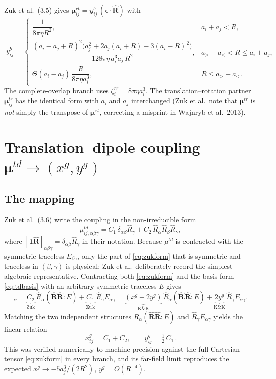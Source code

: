 \documentclass[11pt]{article}
\newcommand{\Rh}{\hat{\mathbf{R}}}
\newcommand{\Rhh}[1]{\hat{R}_{#1}}
\newcommand{\one}{\mathbf{1}}
\newcommand{\eps}{\bm{\epsilon}}
\begin{document}
Zuk et al.\ (3.5) gives $\bm{\mu}^{rt}_{ij}=y^b_{ij}\,(\eps\cdot\Rh)$ with
\begin{equation}
\boxed{\;
y^b_{ij}=
\begin{cases}
\dfrac{1}{8\pi\eta R^2}, & a_i+a_j<R,\\[12pt]
\dfrac{(a_i-a_j+R)^2\big(a_j^2+2a_j(a_i+R)-3(a_i-R)^2\big)}{128\pi\eta\, a_i^3 a_j\,R^2},
& a_>-a_<<R\le a_i+a_j,\\[12pt]
\Theta(a_i-a_j)\,\dfrac{R}{8\pi\eta a_i^3}, & R\le a_>-a_<.
\end{cases}\;}
\end{equation}
The complete-overlap branch uses $\zeta^{rr}_i=8\pi\eta a_i^3$.  The
translation--rotation partner $\bm{\mu}^{tr}_{ij}$ has the identical form with $a_i$ and
$a_j$ interchanged (Zuk et al.\ note that $\bm{\mu}^{tr}$ is \emph{not} simply the transpose
of $\bm{\mu}^{rt}$, correcting a misprint in Wajnryb et al.\ 2013).

\section{Translation--dipole coupling \texorpdfstring{$\bm{\mu}^{td}\to(x^g,y^g)$}{mu-td to (xg,yg)}}

\subsection*{The mapping}
Zuk et al.\ (3.6) write the coupling in the non-irreducible form
\begin{equation}
\mu^{td}_{ij,\alpha\beta\gamma}=C_1\,\delta_{\alpha\beta}\Rhh{\gamma}+C_2\,\Rhh{\alpha}\Rhh{\beta}\Rhh{\gamma},
\label{eq:zukform}
\end{equation}
where $[\one\Rh]_{\alpha\beta\gamma}=\delta_{\alpha\beta}\Rhh{\gamma}$ in their notation.
Because $\mu^{td}$ is contracted with the symmetric traceless $E_{\beta\gamma}$, only the
part of \eqref{eq:zukform} that is symmetric and traceless in $(\beta,\gamma)$ is physical;
Zuk et al.\ deliberately record the simplest algebraic representative.  Contracting both
\eqref{eq:zukform} and the basis form \eqref{eq:tdbasis} with an arbitrary symmetric
traceless $E$ gives
\begin{equation}
[\mu^{td}\!:\!E]_\alpha
=\underbrace{C_2}_{\text{Zuk}}\,\Rhh{\alpha}(\Rh\Rh\!:\!E)+\underbrace{C_1}_{\text{Zuk}}\,\Rhh{\gamma}E_{\alpha\gamma}
=\underbrace{(x^g-2y^g)}_{\text{K\&K}}\,\Rhh{\alpha}(\Rh\Rh\!:\!E)+\underbrace{2y^g}_{\text{K\&K}}\,\Rhh{\gamma}E_{\alpha\gamma}.
\end{equation}
Matching the two independent structures $\Rhh{\alpha}(\Rh\Rh\!:\!E)$ and $\Rhh{\gamma}E_{\alpha\gamma}$
yields the linear relation
\begin{equation}
\boxed{\,x^g_{ij}=C_1+C_2,\qquad y^g_{ij}=\tfrac12\,C_1\,.}
\label{eq:mapping}
\end{equation}
This was verified numerically to machine precision against the full Cartesian tensor
\eqref{eq:zukform} in every branch, and its far-field limit reproduces the expected
$x^g\to-5a_j^3/(2R^2)$, $y^g=O(R^{-4})$.
\end{document}
